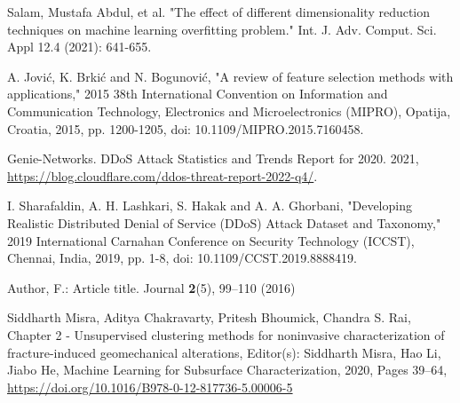 \documentclass[runningheads]{llncs}
\begin{document}
\begin{thebibliography}{8}
Salam, Mustafa Abdul, et al. "The effect of different dimensionality reduction techniques on machine learning overfitting problem." Int. J. Adv. Comput. Sci. Appl 12.4 (2021): 641-655.

A. Jović, K. Brkić and N. Bogunović, "A review of feature selection methods with applications," 2015 38th International Convention on Information and Communication Technology, Electronics and Microelectronics (MIPRO), Opatija, Croatia, 2015, pp. 1200-1205, doi: 10.1109/MIPRO.2015.7160458.

Genie-Networks. DDoS Attack Statistics and Trends Report for 2020. 2021, \url{https://blog.cloudflare.com/ddos-threat-report-2022-q4/}.

I. Sharafaldin, A. H. Lashkari, S. Hakak and A. A. Ghorbani, "Developing Realistic Distributed Denial of Service (DDoS) Attack Dataset and Taxonomy," 2019 International Carnahan Conference on Security Technology (ICCST), Chennai, India, 2019, pp. 1-8, doi: 10.1109/CCST.2019.8888419.

Author, F.: Article title. Journal \textbf{2}(5), 99--110 (2016)

Siddharth Misra, Aditya Chakravarty, Pritesh Bhoumick, Chandra S. Rai,
Chapter 2 - Unsupervised clustering methods for noninvasive characterization of fracture-induced geomechanical alterations,
Editor(s): Siddharth Misra, Hao Li, Jiabo He,
Machine Learning for Subsurface Characterization,
2020, Pages 39--64, \url{https://doi.org/10.1016/B978-0-12-817736-5.00006-5}


\end{thebibliography}
\end{document}
